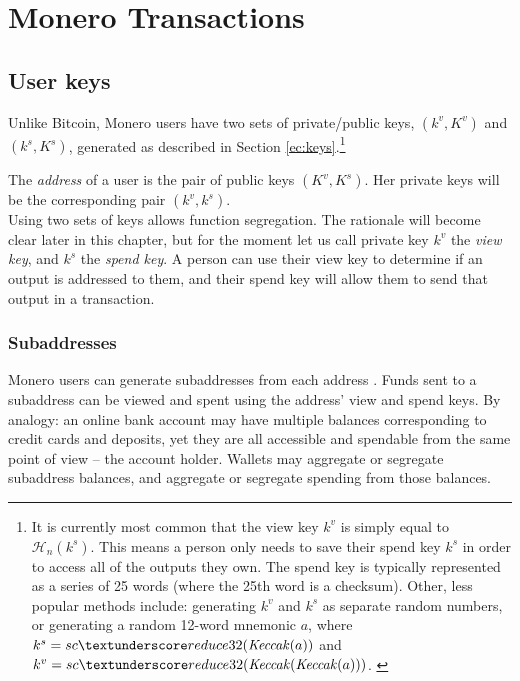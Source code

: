 

\chapter{Monero Transactions}
\label{chapter:transactions}

\section{User keys}

Unlike Bitcoin, Monero users have two sets of private/public keys, \((k^v, K^v)\) and \( (k^s, K^s) \), generated as described in Section \ref{ec:keys}.\footnote{It is currently most common that the view key $k^v$ is simply equal to $\mathcal{H}_n(k^s)$. This means a person only needs to save their spend key $k^s$ in order to access all of the outputs they own. The spend key is typically represented as a series of 25 words (where the 25th word is a checksum). Other, less popular methods include: generating $k^v$ and $k^s$ as separate random numbers, or generating a random 12-word mnemonic $a$, where $k^s = sc\textunderscore reduce32(\mathit{Keccak}(a))$ and $k^v = sc\textunderscore reduce32(\mathit{Keccak}(\mathit{Keccak}(a)))$. \cite{luigi-address}}

The {\em address} of a user is the pair of public keys \((K^v, K^s)\). Her private keys will be the corresponding pair \( (k^v, k^s) \).
\\

Using two sets of keys allows function segregation. The rationale will become clear later in this chapter, but for the moment let us call private key $k^v$ the {\em view key}, and $k^s$ the {\em spend key}. A person can use their view key to determine if an output is addressed to them, and their spend key will allow them to send that output in a transaction.


\subsection{Subaddresses}
\label{sec:subaddresses}

Monero users can generate subaddresses from each address \cite{MRL-0006}.  Funds sent to a subaddress can be viewed and spent using the address’ view and spend keys. By analogy: an online bank account may have multiple balances corresponding to credit cards and deposits, yet they are all accessible and spendable from the same point of view – the account holder. Wallets may aggregate or segregate subaddress balances, and aggregate or segregate spending from those balances.

